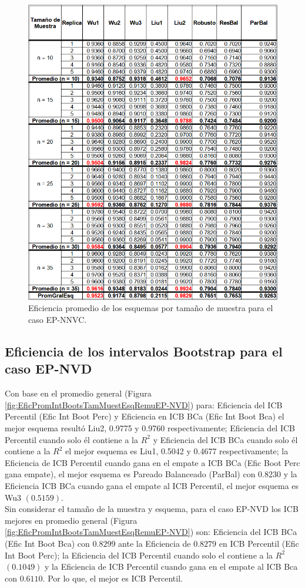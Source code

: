 \begin{figure}[ht] 
	\centering 
	\includegraphics[width=0.70\linewidth]{img/EP_NNVC_Efic_Esq.png} 
	\caption{Eficiencia promedio de los esquemas por tamaño de muestra para el caso EP-NNVC.} 
	\label{fig:EficPromEsqTamMuesEsqRemuEP-NNVC}
\end{figure}
\FloatBarrier



\subsection{Eficiencia de los intervalos Bootstrap para el caso EP-NVD}
Con base en el promedio general (Figura \ref{fig:EficPromIntBootsTamMuestEsqRemuEP-NVD}) para: Eficiencia del ICB Percentil (Efic Int Boot Perc) y Eficiencia en ICB BCa (Efic Int Boot Bca) el mejor esquema resultó Liu2, 0.9775 y 0.9760 respectivamente; Eficiencia del ICB Percentil cuando solo él contiene a la $R^{2}$ y Eficiencia del ICB BCa cuando solo él contiene a la $R^{2}$ el mejor esquema es Liu1, 0.5042 y 0.4677 respectivamente; 
la Eficiencia de ICB Percentil cuando gana en el empate a ICB BCa (Efic Boot Perc gana empate), el mejor esquema es Pareado Balanceado (ParBal) con 0.8230 y la Eficiencia ICB BCa cuando gana el empate al ICB Percentil, el mejor esquema es Wu3 $(0.5159)$.\\


Sin considerar el tamaño de la muestra y esquema, para el caso EP-NVD los ICB mejores en promedio general (Figura \ref{fig:EficPromIntBootsTamMuestEsqRemuEP-NVD}) son: Eficiencia del ICB BCa (Efic Int Boot Bca) con $0.8299$ ante la Eficiencia de $0.8279$ en ICB Percentil (Efic Int Boot Perc); la Eficiencia del ICB Percentil cuando solo el contiene a la $R^{2}$ $(0.1049)$ y la Eficiencia de ICB Percentil cuando gana en el empate al ICB Bca con $0.6110$. Por lo que, el mejor es ICB Percentil.\\


